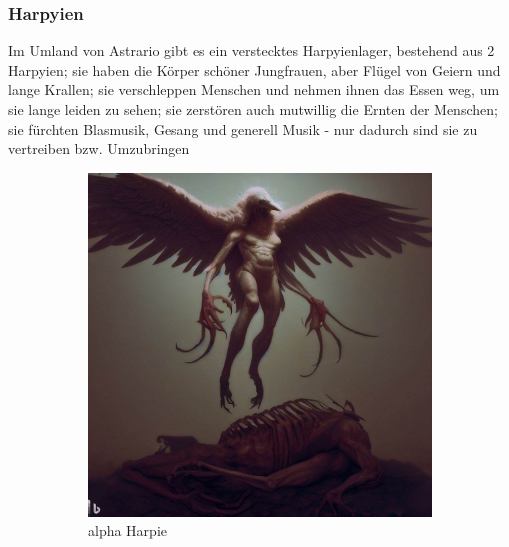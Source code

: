 \documentclass[11pt, twoside]{article}
\begin{document}
\subsubsection{Harpyien\label{harpie}}
\label{sec:orgb58cfb1}
Im Umland von Astrario gibt es ein verstecktes Harpyienlager, bestehend aus 2 Harpyien; sie haben die Körper schöner Jungfrauen, aber Flügel von Geiern und lange Krallen; sie verschleppen Menschen und nehmen ihnen das Essen weg, um sie lange leiden zu sehen; sie zerstören auch mutwillig die Ernten der Menschen; sie fürchten Blasmusik, Gesang und generell Musik - nur dadurch sind sie zu vertreiben bzw. Umzubringen
\begin{figure}[H]
\centering
\caption{Harpyien}
\label{fig:harpie}
  \begin{subfigure}{0.3\textwidth}
    \centering
    \includegraphics[width=0.99\linewidth]{harpie1.jpeg}
    \caption{alpha Harpie}
  \end{subfigure}%
  \begin{subfigure}{0.3\textwidth}
    \centering

\end{subfigure}
\end{figure}
\end{document}
